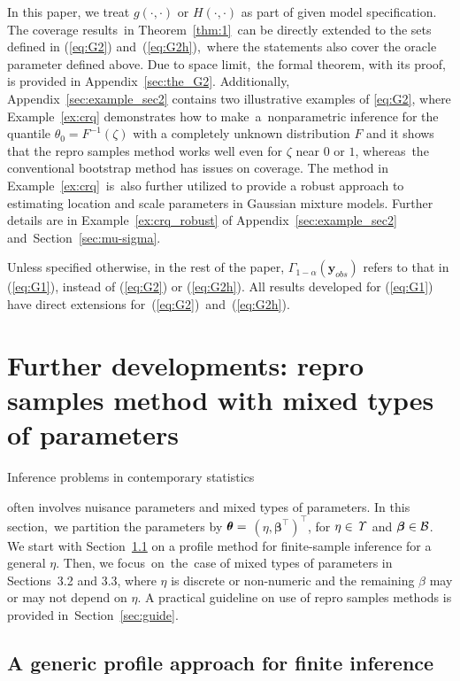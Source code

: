 \documentclass[12pt]{article}
\theoremstyle{shortspace}
\def\*#1{\bm{#1}}
\def\btheta{\mathop{\theta\kern-.45em\hbox{$\theta$}}\nolimits}
\begin{document}
In this paper, we treat $g(\cdot, \cdot)$ or $H(\cdot, \cdot)$ as part of given model specification. The coverage results~in Theorem~\ref{thm:1}~can be directly extended to the sets  
defined in (\ref{eq:G2}) and~(\ref{eq:G2h}),~where the statements also cover the oracle parameter defined above. Due to space limit,~the formal theorem, with its proof, is provided in Appendix~\ref{sec:the_G2}. Additionally, Appendix~\ref{sec:example_sec2} contains two 
illustrative examples of  \eqref{eq:G2}, where   
Example~\ref{ex:crq}  demonstrates how to make~a~nonparametric 
inference for the 
quantile $\theta_0 = F^{-1}(\zeta)$ with a completely unknown distribution $F$ and it shows that the repro samples method
works well even for $\zeta$ near $0$ or $1$, whereas~the conventional bootstrap method has issues on coverage.
The method in 
Example~\ref{ex:crq}~is~also further utilized 
to provide a robust approach to estimating location and scale parameters in Gaussian mixture models. Further details are in Example~\ref{ex:crq_robust} of Appendix~\ref{sec:example_sec2} and~Section~\ref{sec:mu-sigma}.   

Unless specified otherwise, in the rest of the paper,  
$\Gamma_{1-\alpha}(\*y_{obs})$ refers to that in (\ref{eq:G1}), instead of (\ref{eq:G2}) or (\ref{eq:G2h}). All results developed for (\ref{eq:G1}) have direct extensions for~(\ref{eq:G2})~and~(\ref{eq:G2h}).






\section{Further developments: repro samples method with mixed types of parameters}\label{sec:3}


Inference problems 
in contemporary statistics

often involves nuisance parameters and mixed types of parameters. 
In this section,~we partition the parameters by $\btheta = $ $(\eta, {\*\beta}^\top)^\top$, for $\eta \in {\it \Upsilon}$ and $\*\beta \in {\cal B}$.  
We start with Section~\ref{sec: nuisance_control} on a profile method for finite-sample inference for a general $\eta$. Then, we focus~on~the~case of mixed types of parameters in Sections~3.2 and 3.3, where $\eta$ is discrete or non-numeric and the remaining $\beta$ may or may not depend on $\eta$. A practical guideline on use of repro samples methods is provided in~Section~\ref{sec:guide}.

\subsection{A generic profile approach for finite inference}
\label{sec: nuisance_control}
\end{document}
